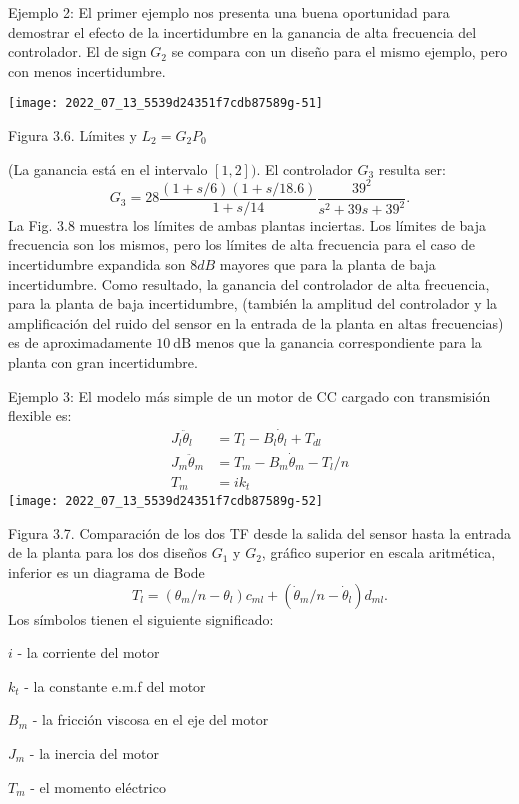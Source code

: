 Ejemplo 2: El primer ejemplo nos presenta una buena oportunidad para demostrar el efecto de la incertidumbre en la ganancia de alta frecuencia del controlador. El de$\operatorname{sign} G_{2}$ se compara con un diseño para el mismo ejemplo, pero con menos incertidumbre.

\texttt{[image: 2022\_07\_13\_5539d24351f7cdb87589g-51]}

Figura 3.6. Límites y $L_{2}=G_{2} P_{0}$

(La ganancia está en el intervalo $[1,2])$. El controlador $G_{3}$ resulta ser:
$$
G_{3}=28 \frac{(1+s / 6)(1+s / 18.6)}{1+s / 14} \frac{39^{2}}{s^{2}+39 s+39^{2}} .
$$
La Fig. $3.8$ muestra los límites de ambas plantas inciertas. Los límites de baja frecuencia son los mismos, pero los límites de alta frecuencia para el caso de incertidumbre expandida son $8 d B$ mayores que para la planta de baja incertidumbre. Como resultado, la ganancia del controlador de alta frecuencia, para la planta de baja incertidumbre, (también la amplitud del controlador y la amplificación del ruido del sensor en la entrada de la planta en altas frecuencias) es de aproximadamente $ 10 \mathrm{~dB}$ menos que la ganancia correspondiente para la planta con gran incertidumbre.

Ejemplo 3: El modelo más simple de un motor de CC cargado con transmisión flexible es:
$$
\begin{aligned}
J_{l} \ddot{\theta}_{l} &=T_{l}-B_{l} \dot{\theta}_{l}+T_{d l} \\
J_{m} \ddot{\theta}_{m} &=T_{m}-B_{m} \dot{\theta}_{m}-T_{l} / n \\
T_{m} &=i k_{t}
\end{aligned}
$$
\texttt{[image: 2022\_07\_13\_5539d24351f7cdb87589g-52]}

Figura 3.7. Comparación de los dos TF desde la salida del sensor hasta la entrada de la planta para los dos diseños $G_{1}$ y $G_{2}$, gráfico superior en escala aritmética, inferior es un diagrama de Bode
$$
T_{l}=\left(\theta_{m} / n-\theta_{l}\right) c_{m l}+\left(\dot{\theta}_{m} / n-\dot{\theta}_{l}\right) d_{m l} .
$$
Los símbolos tienen el siguiente significado:

$i$ - la corriente del motor

$k_{t}$ - la constante e.m.f del motor

$B_{m}$ - la fricción viscosa en el eje del motor

$J_{m}$ - la inercia del motor

$T_{m}$ - el momento eléctrico

